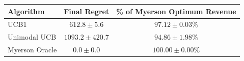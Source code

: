 \begin{tabular}{lcc}
\hline
Algorithm & Final Regret & \% of Myerson Optimum Revenue \\
\hline
UCB1 & $612.8 \pm 5.6$ & $97.12 \pm 0.03\%$ \\
Unimodal UCB & $1093.2 \pm 420.7$ & $94.86 \pm 1.98\%$ \\
Myerson Oracle & $0.0 \pm 0.0$ & $100.00 \pm 0.00\%$ \\
\hline
\end{tabular}
